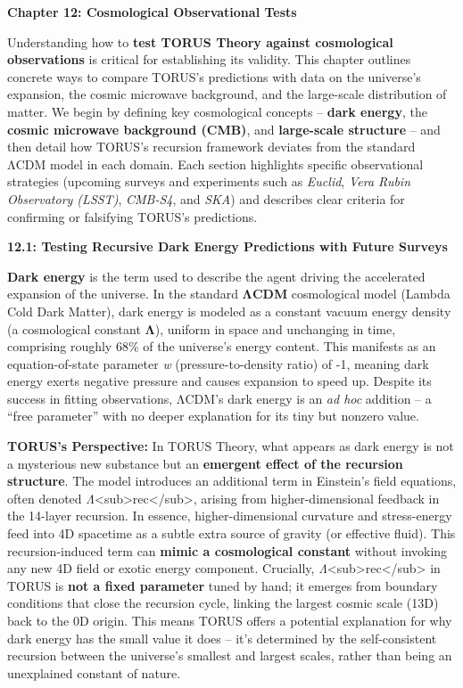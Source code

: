 \documentclass[
]{article}
\begin{document}
\textbf{Chapter 12: Cosmological Observational Tests}

Understanding how to \textbf{test TORUS Theory against cosmological
observations} is critical for establishing its validity. This chapter
outlines concrete ways to compare TORUS's predictions with data on the
universe's expansion, the cosmic microwave background, and the
large-scale distribution of matter. We begin by defining key
cosmological concepts -- \textbf{dark energy}, the \textbf{cosmic
microwave background (CMB)}, and \textbf{large-scale structure} -- and
then detail how TORUS's recursion framework deviates from the standard
ΛCDM model in each domain. Each section highlights specific
observational strategies (upcoming surveys and experiments such as
\emph{Euclid}, \emph{Vera Rubin Observatory (LSST)}, \emph{CMB-S4}, and
\emph{SKA}) and describes clear criteria for confirming or falsifying
TORUS's predictions.

\textbf{12.1: Testing Recursive Dark Energy Predictions with Future
Surveys}

\textbf{Dark energy} is the term used to describe the agent driving the
accelerated expansion of the universe. In the standard \textbf{ΛCDM}
cosmological model (Lambda Cold Dark Matter), dark energy is modeled as
a constant vacuum energy density (a cosmological constant \textbf{Λ}),
uniform in space and unchanging in time, comprising roughly 68\% of the
universe's energy content. This manifests as an equation-of-state
parameter \emph{w} (pressure-to-density ratio) of -1, meaning dark
energy exerts negative pressure and causes expansion to speed up.
Despite its success in fitting observations, ΛCDM's dark energy is an
\emph{ad hoc} addition -- a ``free parameter'' with no deeper
explanation for its tiny but nonzero value.

\textbf{TORUS's Perspective:} In TORUS Theory, what appears as dark
energy is not a mysterious new substance but an \textbf{emergent effect
of the recursion structure}. The model introduces an additional term in
Einstein's field equations, often denoted
\emph{Λ}\textless sub\textgreater rec\textless/sub\textgreater, arising
from higher-dimensional feedback in the 14-layer recursion\hspace{0pt}.
In essence, higher-dimensional curvature and stress-energy feed into 4D
spacetime as a subtle extra source of gravity (or effective
fluid)\hspace{0pt}. This recursion-induced term can \textbf{mimic a
cosmological constant} without invoking any new 4D field or exotic
energy component\hspace{0pt}. Crucially,
\emph{Λ}\textless sub\textgreater rec\textless/sub\textgreater{} in
TORUS is \textbf{not a fixed parameter} tuned by hand; it emerges from
boundary conditions that close the recursion cycle, linking the largest
cosmic scale (13D) back to the 0D origin\hspace{0pt}. This means TORUS
offers a potential explanation for why dark energy has the small value
it does -- it's determined by the self-consistent recursion between the
universe's smallest and largest scales, rather than being an unexplained
constant of nature.
\end{document}
